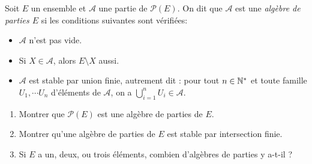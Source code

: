 \begin{exercice}
Soit $E$ un ensemble et  $\mathcal A$ une partie de $\mathcal P(E)$. On dit que $\mathcal A$ est une \emph{algèbre de parties $E$} si les conditions suivantes sont vérifiées:
\begin{itemize}
\item $\mathcal A$ n'est pas vide.
\item Si $X\in \mathcal A$, alors $E\setminus X$ aussi.
\item $\mathcal A$ est stable par union finie, autrement dit : pour tout $n\in \mathbb{N}^*$ et toute famille $U_1, \cdots U_n$ d'éléments de $\mathcal A$, on a $\bigcup_{i=1}^n U_i\in \mathcal A$.
\end{itemize}
\begin{enumerate}
\item Montrer que $\mathcal P(E)$ est une algèbre de parties de $E$.
\item Montrer  qu'une algèbre de parties de $E$ est stable par intersection finie.
\item Si $E$ a un, deux, ou trois éléments, combien d'algèbres de parties y a-t-il ?
\end{enumerate}
\end{exercice}
